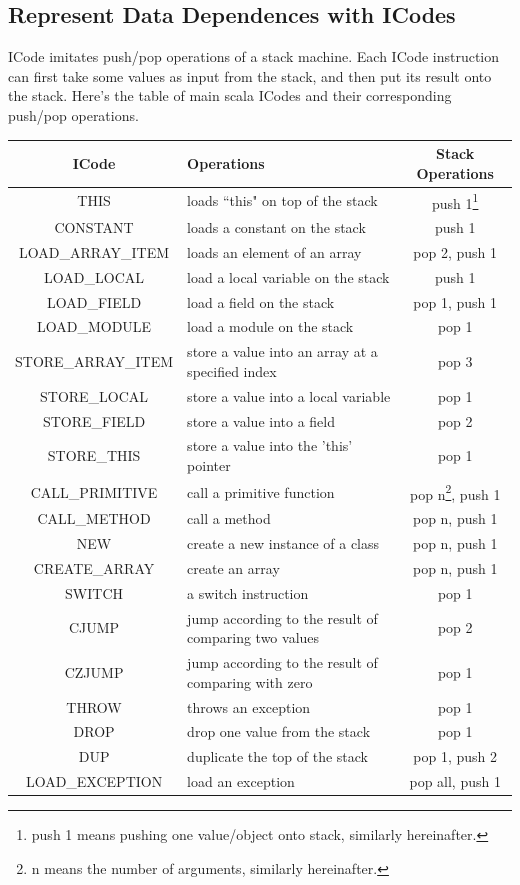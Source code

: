 \documentclass{article}[12pt]
\begin{document}
\subsection{Represent Data Dependences with ICodes}
ICode imitates push/pop operations of a stack machine. Each ICode instruction can first take some values as input from the stack, and then put its result onto the stack. Here's the table of main scala ICodes and their corresponding push/pop operations. 
\begin{table}[h]
\footnotesize
\begin{tabular}{c|p{5cm}|c}
\hline
ICode & Operations & Stack Operations \\\hline
THIS & loads ``this" on top of the stack & push 1\footnote{push 1 means pushing one value/object onto stack, similarly hereinafter.}\\\hline
CONSTANT & loads a constant on the stack & push 1\\\hline
LOAD\_ARRAY\_ITEM & loads an element of an array & pop 2, push 1\\\hline
LOAD\_LOCAL & load a local variable on the stack & push 1\\\hline
LOAD\_FIELD & load a field on the stack & pop 1, push 1\\\hline
LOAD\_MODULE & load a module on the stack & pop 1\\\hline
STORE\_ARRAY\_ITEM & store a value into an array at a specified index & pop 3\\\hline
STORE\_LOCAL & store a value into a local variable & pop 1\\\hline
STORE\_FIELD & store a value into a field & pop 2\\\hline
STORE\_THIS & store a value into the 'this' pointer & pop 1\\\hline
CALL\_PRIMITIVE & call a primitive function & pop n\footnote{n means the number of arguments, similarly hereinafter.}, push 1\\\hline
CALL\_METHOD & call a method & pop n, push 1\\\hline
NEW & create a new instance of a class & pop n, push 1\\\hline
CREATE\_ARRAY & create an array & pop n, push 1\\\hline
SWITCH & a switch instruction & pop 1\\\hline
CJUMP & jump according to the result of comparing two values & pop 2\\\hline
CZJUMP & jump according to the result of comparing with zero & pop 1\\\hline
THROW & throws an exception & pop 1\\\hline
DROP & drop one value from the stack & pop 1\\\hline
DUP & duplicate the top of the stack & pop 1, push 2\\\hline
LOAD\_EXCEPTION & load an exception & pop all, push 1\\\hline
\end{tabular}
\end{table}
\end{document}
